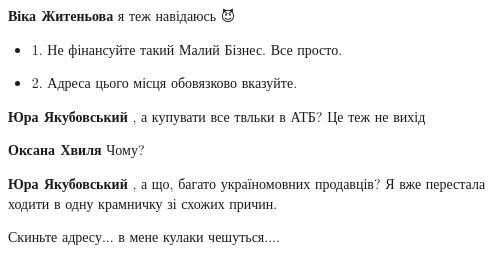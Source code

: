 \begin{itemize}
\begin{itemize}
\textbf{Віка Житеньова} я теж навідаюсь 😈
\end{itemize}

 

\begin{itemize}
  \item 1. Не фінансуйте такий Малий Бізнес. Все просто.
  \item 2. Адреса цього місця обовязково вказуйте.
\end{itemize}

\begin{itemize}
 
\textbf{Юра Якубовський} , а купувати все твльки в АТБ? Це теж не вихід

 
\textbf{Оксана Хвиля} Чому?

 
\textbf{Юра Якубовський} , а що, багато україномовних продавців? Я вже перестала ходити в одну крамничку зі схожих причин.
\end{itemize}

 
Скиньте адресу... в мене кулаки чешуться....

\begin{itemize}
 

\end{itemize}
\end{itemize}
